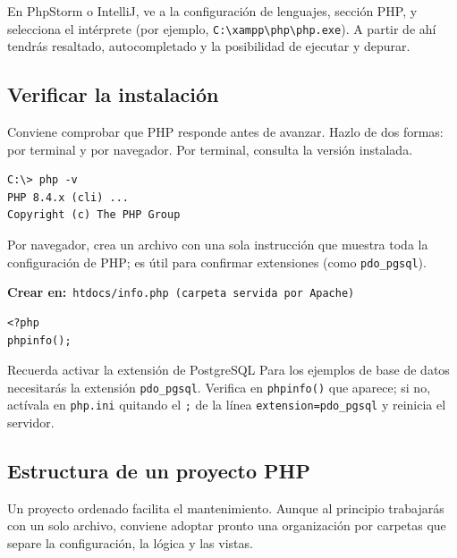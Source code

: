 \documentclass[11pt]{article}
\begin{document}
En PhpStorm o IntelliJ, ve a la configuración de lenguajes, sección PHP, y selecciona el intérprete (por ejemplo, \texttt{C:\allowbreak{}\textbackslash{}xampp\textbackslash{}php\textbackslash{}php.\allowbreak{}exe}). A partir de ahí tendrás resaltado, autocompletado y la posibilidad de ejecutar y depurar.

\subsection{Verificar la instalación}
Conviene comprobar que PHP responde antes de avanzar. Hazlo de dos formas: por terminal y por navegador. Por terminal, consulta la versión instalada.

\begin{cajacodigo}
\begin{lstlisting}[style=markup]
C:\> php -v
PHP 8.4.x (cli) ...
Copyright (c) The PHP Group
\end{lstlisting}
\end{cajacodigo}
\vspace{2pt}
Por navegador, crea un archivo con una sola instrucción que muestra toda la configuración de PHP; es útil para confirmar extensiones (como \texttt{pdo\_pgsql}).

{\small\color{phpazulo}\textbf{Crear en:}~}\texttt{htdocs/\allowbreak{}info.\allowbreak{}php  (carpeta servida por Apache)}\par\nobreak\vspace{-1pt}
\begin{cajacodigo}
\begin{lstlisting}[style=php]
<?php
phpinfo();
\end{lstlisting}
\end{cajacodigo}
\vspace{2pt}
\begin{cajatip}{Recuerda activar la extensión de PostgreSQL}
Para los ejemplos de base de datos necesitarás la extensión \texttt{pdo\_pgsql}. Verifica en \texttt{phpinfo()} que aparece; si no, actívala en \texttt{php.\allowbreak{}ini} quitando el \texttt{;\allowbreak{}} de la línea \texttt{extension=\allowbreak{}pdo\_pgsql} y reinicia el servidor.\par
\end{cajatip}
\subsection{Estructura de un proyecto PHP}
Un proyecto ordenado facilita el mantenimiento. Aunque al principio trabajarás con un solo archivo, conviene adoptar pronto una organización por carpetas que separe la configuración, la lógica y las vistas.
\end{document}

